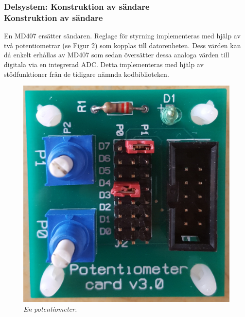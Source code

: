 \documentclass[a4paper]{article}
\begin{document}
\subsubsection{Delsystem: Konstruktion av sändare \\ Konstruktion av sändare}
En MD407 ersätter sändaren. Reglage för styrning implementeras med hjälp av två potentiometrar (se Figur 2) som kopplas till datorenheten. Dess värden kan då enkelt erhållas av MD407 som sedan översätter dessa analoga värden till digitala via en integrerad ADC. Detta implementeras med hjälp av stödfunktioner från de tidigare nämnda kodbiblioteken.

\begin{figure}[H]
\includegraphics[scale=0.04]{Potentiometer.jpg}
\centering
\caption{\it En potentiometer.}
\end{figure} 



\end{document}
